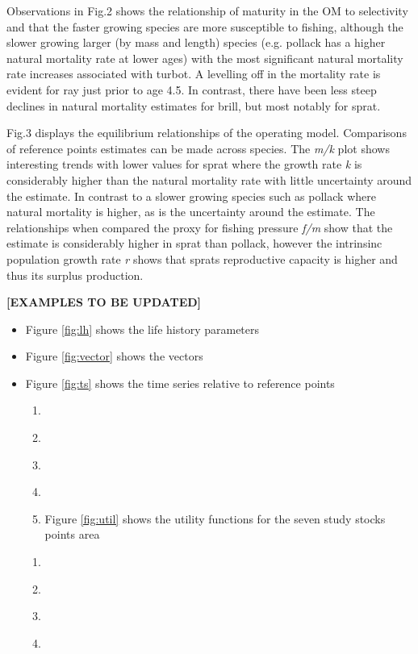 \documentclass[preprint,12pt]{elsarticle}
\begin{document}
Observations in Fig.2 shows the relationship of maturity in the OM to selectivity and that the faster growing species are more susceptible to fishing, although the slower growing larger (by mass and length) species (e.g. pollack has a higher natural mortality rate at lower ages) with the most significant natural mortality rate increases associated with turbot. A levelling off in the mortality rate is evident for ray just prior to age 4.5. In contrast, there have been less steep declines in natural mortality estimates for brill, but most notably for sprat. 

Fig.3 displays the equilibrium relationships of the operating model. Comparisons of reference points estimates can be made across species.  The \textit{m/k} plot shows interesting trends with lower values for sprat where the growth rate \textit{k} is considerably higher than the natural mortality rate with little uncertainty around the estimate. In contrast to a slower growing species such as pollack where natural mortality is higher, as is the uncertainty around the estimate. The relationships when compared the proxy for fishing pressure \textit{f/m} show that the estimate is considerably higher in sprat than pollack, however the intrinsinc population growth rate \textit{r} shows that sprats reproductive capacity is higher and thus its surplus production. 


\textbf{[EXAMPLES TO BE UPDATED]}
\begin{itemize}
\item Figure \ref{fig:lh} shows the life history parameters
\item Figure \ref{fig:vector} shows the vectors
\item Figure \ref{fig:ts} shows the time series relative to reference points
\begin{enumerate}
 \item ~
 \item ~
 \item ~
 \item ~\item Figure \ref{fig:util} shows the utility functions for the seven study stocks points area
\end{enumerate}
\begin{enumerate}
 \item ~
 \item ~
 \item ~
 \item ~
\end{enumerate}

\end{itemize}
\end{document}
